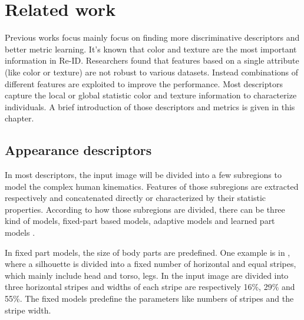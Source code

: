 \chapter{Related work}
Previous works focus mainly focus on finding more discriminative descriptors and better metric learning. It's known that color and texture are the most important information in Re-ID. Researchers found that features based on a single attribute (like color or texture) are not robust to various datasets. Instead combinations of different features are exploited to improve the performance. Most descriptors capture the local or global statistic color and texture information to characterize individuals. A brief introduction of those descriptors and metrics is given in this chapter.

\section{Appearance descriptors}
In most descriptors, the input image will be divided into a few subregions to model the complex human kinematics. Features of those subregions are extracted respectively and concatenated directly or characterized by their statistic properties. According to how those subregions are divided, there can be three kind of models, fixed-part based models, adaptive models and learned part models \cite{Appearancedesc}. 

In fixed part models, the size of body parts are predefined. One example is in \cite{ImportantFeatures, PRDC, REIDSVM}, where a silhouette is divided into a fixed number of horizontal and equal stripes, which mainly include head and torso, legs. In \cite{AppBasedREID} the input image are divided into three horizontal stripes and widths of each stripe are respectively 16\%, 29\% and 55\%.  The fixed models predefine the parameters like numbers of stripes and the stripe width. 

